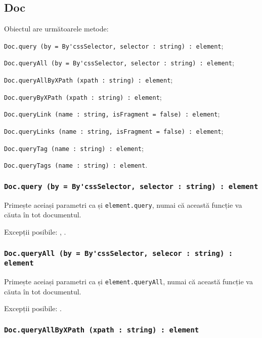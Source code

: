 \subsection{{\color{orange} Doc}}

Obiectul \dom{} are următoarele metode:
\begin{icItems}
	\item \lstinline|Doc.query (by = By'cssSelector, selector : string) : element|;
	\item \lstinline|Doc.queryAll (by = By'cssSelector, selector : string) : element|;
	\item \lstinline|Doc.queryAllByXPath (xpath : string) : element|;
	\item \lstinline|Doc.queryByXPath (xpath : string) : element|;
	\item \lstinline|Doc.queryLink (name : string, isFragment = false) : element|;
	\item \lstinline|Doc.queryLinks (name : string, isFragment = false) : element|;
	\item \lstinline|Doc.queryTag (name : string) : element|;
	\item \lstinline|Doc.queryTags (name : string) : element|.
\end{icItems}

\subsubsection{\lstinline|Doc.query (by = By'cssSelector, selector : string) : element|}

Primește aceiași parametri ca și  \lstinline|element.query|, numai că această funcție va căuta în tot documentul.

Excepții posibile: , .

\subsubsection{\lstinline|Doc.queryAll (by = By'cssSelector, selecor : string) : element|}

Primește aceiași parametri ca și \lstinline|element.queryAll|, numai că această funcție va căuta în tot documentul.

Excepții posibile: .

\subsubsection{\lstinline|Doc.queryAllByXPath (xpath : string) : element|}

